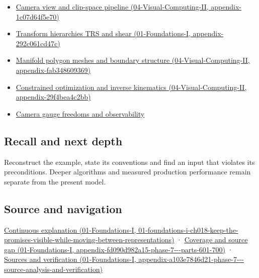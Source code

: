 \begin{itemize}
\item
  \href{../04-Visual-Computing-II/main.pdf\#nameddest=appendix-1c07d64f5e70}{Camera view and clip-space pipeline (04-Visual-Computing-II, appendix-1c07d64f5e70)}
\item
  \href{../01-Foundations-I/main.pdf\#nameddest=appendix-292c061cd47c}{Transform hierarchies TRS and shear (01-Foundations-I, appendix-292c061cd47c)}
\item
  \href{../04-Visual-Computing-II/main.pdf\#nameddest=appendix-fab348609369}{Manifold polygon meshes and boundary structure (04-Visual-Computing-II, appendix-fab348609369)}
\item
  \href{../04-Visual-Computing-II/main.pdf\#nameddest=appendix-29f4bea4c2bb}{Constrained optimization and inverse kinematics (04-Visual-Computing-II, appendix-29f4bea4c2bb)}
\item
  \hyperref[appendix-113f0267e5f4]{Camera gauge freedoms and observability}
\end{itemize}

\subsection{Recall and next depth}\label{appendix-1bae9457dbc3-recall-and-next-depth}

Reconstruct the example, state its conventions and find an input that violates its preconditions. Deeper algorithms and measured production performance remain separate from the present model.

\subsection{Source and navigation}\label{appendix-1bae9457dbc3-source-and-navigation}

\href{../01-Foundations-I/main.pdf\#nameddest=01-foundations-i-ch018-keep-the-promises-visible-while-moving-between-representations}{Continuous explanation (01-Foundations-I, 01-foundations-i-ch018-keep-the-promises-visible-while-moving-between-representations)} · \href{../01-Foundations-I/main.pdf\#nameddest=appendix-fd090d982a15-phase-7---parts-601-700}{Coverage and source gap (01-Foundations-I, appendix-fd090d982a15-phase-7-\/-\/-parts-601-700)} · \href{../01-Foundations-I/main.pdf\#nameddest=appendix-a103e7846d21-phase-7---source-analysis-and-verification}{Sources and verification (01-Foundations-I, appendix-a103e7846d21-phase-7-\/-\/-source-analysis-and-verification)}

